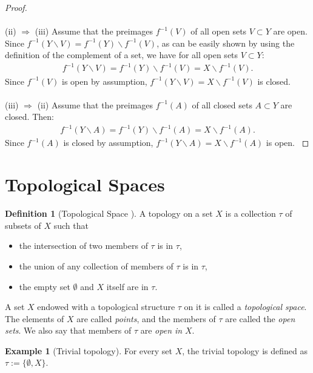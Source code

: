 \documentclass[12pt, a4paper]{article}
\numberwithin{equation}{section}
\theoremstyle{definition}
\theoremstyle{definition}
\newtheorem{defn}[thm]{Definition} %
\newtheorem{exmp}[thm]{Example} %
\begin{document}
\begin{proof}
		\\ 
		\\
		(ii) $\Rightarrow$ (iii) Assume that the preimages $f^{-1}(V)$ of all open sets $V\subset Y$ are open. Since $f^{-1}(Y\backslash V) = f^{-1}(Y)\backslash f^{-1}(V)$, as can be easily shown by using the definition of the complement of a set, we have for all open sets $V \subset Y$: 
		\begin{align}
			f^{-1}(Y\backslash V) = f^{-1}(Y)\backslash f^{-1}(V) = X\backslash f^{-1}(V). 
		\end{align}
		Since $f^{-1}(V)$ is open by assumption, $f^{-1}(Y\backslash V) = X\backslash f^{-1}(V)$ is closed. 
		\\ 
		\\
		(iii) $\Rightarrow$ (ii) Assume that the preimages $f^{-1}(A)$
		of all closed sets $A\subset Y$ are closed. Then: 
		\begin{align}
			f^{-1}(Y\backslash A) = f^{-1}(Y)\backslash f^{-1}(A) = X\backslash f^{-1}(A). 
		\end{align}
		Since $f^{-1}(A)$ is closed by assumption, $f^{-1}(Y\backslash A) = X\backslash f^{-1}(A)$ is open. \cite{preimage-of-closed-sets}
	\end{proof} 
	
	\newpage
	\section{Topological Spaces}
		\begin{defn}[Topological Space \cite{topology-singh}]
			A topology on a set $X$ is a collection $\tau$ of subsets of $X$ such that 
			\begin{itemize}
				\item the intersection of two members of $\tau$ is in $\tau$, 
				\item the union of any collection of members of $\tau$ is in $\tau$, 
				\item the empty set $\emptyset$ and $X$ itself are in $\tau$.
			\end{itemize}
			A set $X$ endowed with a topological structure $\tau$ on it is called a \textit{topological space}. The elements of $X$ are called \textit{points}, and the members of $\tau$ are called the \textit{open sets}. We also say that members of $\tau$ are \textit{open in} $X$.
		\end{defn} 
		
		\begin{exmp}[Trivial topology]
			For every set $X$, the trivial topology is defined as $\tau := \{\emptyset, X\}$.
		\end{exmp}
	
\end{document}
